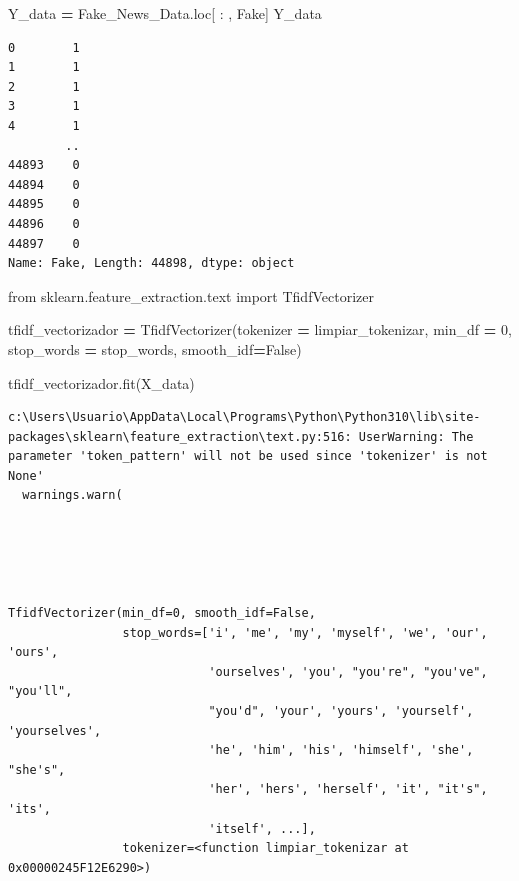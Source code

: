 \documentclass[
  11pt,
  a4paper,
]{article}
\newenvironment{Shaded}{\begin{snugshade}}{\end{snugshade}}
\newcommand{\DecValTok}[1]{\textcolor[rgb]{0.00,0.00,0.81}{#1}}
\newcommand{\ImportTok}[1]{#1}
\newcommand{\NormalTok}[1]{#1}
\newcommand{\OperatorTok}[1]{\textcolor[rgb]{0.81,0.36,0.00}{\textbf{#1}}}
\newcommand{\StringTok}[1]{\textcolor[rgb]{0.31,0.60,0.02}{#1}}
\newcommand{\VariableTok}[1]{\textcolor[rgb]{0.00,0.00,0.00}{#1}}
\begin{document}
\begin{Shaded}
\begin{Highlighting}[]
\NormalTok{Y\_data }\OperatorTok{=}\NormalTok{ Fake\_News\_Data.loc[ : , }\StringTok{\textquotesingle{}Fake\textquotesingle{}}\NormalTok{]}
\NormalTok{Y\_data}
\end{Highlighting}
\end{Shaded}

\begin{verbatim}
0        1
1        1
2        1
3        1
4        1
        ..
44893    0
44894    0
44895    0
44896    0
44897    0
Name: Fake, Length: 44898, dtype: object
\end{verbatim}

\begin{Shaded}
\begin{Highlighting}[]
\ImportTok{from}\NormalTok{ sklearn.feature\_extraction.text }\ImportTok{import}\NormalTok{ TfidfVectorizer}
\end{Highlighting}
\end{Shaded}

\begin{Shaded}
\begin{Highlighting}[]
\NormalTok{tfidf\_vectorizador }\OperatorTok{=}\NormalTok{ TfidfVectorizer(tokenizer  }\OperatorTok{=}\NormalTok{ limpiar\_tokenizar, min\_df }\OperatorTok{=} \DecValTok{0}\NormalTok{, stop\_words }\OperatorTok{=}\NormalTok{ stop\_words, smooth\_idf}\OperatorTok{=}\VariableTok{False}\NormalTok{)}
\end{Highlighting}
\end{Shaded}

\begin{Shaded}
\begin{Highlighting}[]
\NormalTok{tfidf\_vectorizador.fit(X\_data)}
\end{Highlighting}
\end{Shaded}

\begin{verbatim}
c:\Users\Usuario\AppData\Local\Programs\Python\Python310\lib\site-packages\sklearn\feature_extraction\text.py:516: UserWarning: The parameter 'token_pattern' will not be used since 'tokenizer' is not None'
  warnings.warn(





TfidfVectorizer(min_df=0, smooth_idf=False,
                stop_words=['i', 'me', 'my', 'myself', 'we', 'our', 'ours',
                            'ourselves', 'you', "you're", "you've", "you'll",
                            "you'd", 'your', 'yours', 'yourself', 'yourselves',
                            'he', 'him', 'his', 'himself', 'she', "she's",
                            'her', 'hers', 'herself', 'it', "it's", 'its',
                            'itself', ...],
                tokenizer=<function limpiar_tokenizar at 0x00000245F12E6290>)
\end{verbatim}
\end{document}
